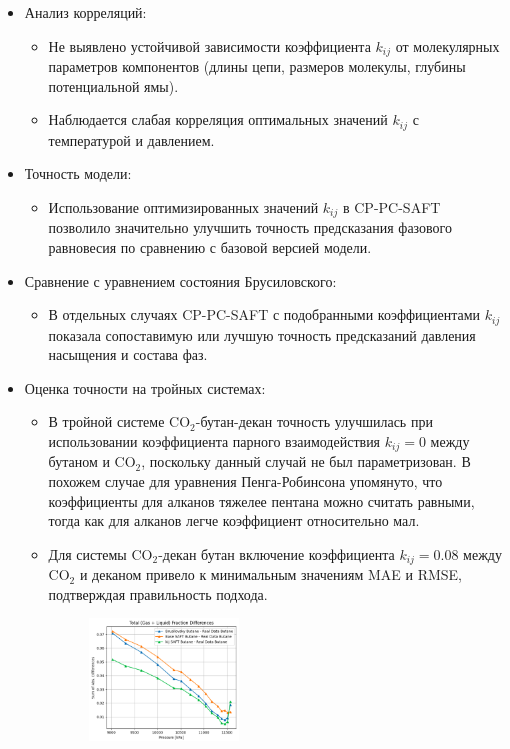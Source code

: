 \documentclass[a4paper,12pt]{article}
\begin{document}
\begin{itemize}
\begin{itemize}
    \end{itemize}
    \item Анализ корреляций:
    \begin{itemize}
        \item Не выявлено устойчивой зависимости коэффициента \( k_{ij} \) от молекулярных параметров компонентов (длины цепи, размеров молекулы, глубины потенциальной ямы).
        \item Наблюдается слабая корреляция оптимальных значений \( k_{ij} \) с температурой и давлением.
    \end{itemize}
    \item Точность модели:
    \begin{itemize}
        \item Использование оптимизированных значений \( k_{ij} \) в CP-PC-SAFT позволило значительно улучшить точность предсказания фазового равновесия по сравнению с базовой версией модели.
    \end{itemize}
    \item Сравнение с уравнением состояния Брусиловского:
    \begin{itemize}
        \item В отдельных случаях CP-PC-SAFT с подобранными коэффициентами \( k_{ij} \) показала сопоставимую или лучшую точность предсказаний давления насыщения и состава фаз.
    \end{itemize}
    \item Оценка точности на тройных системах:
	\begin{itemize}
		\item В тройной системе $\mathrm{CO}_{2}$-бутан-декан точность улучшилась при использовании коэффициента парного взаимодействия $k_{ij} = 0$ между бутаном и $\mathrm{CO}_{2}$, поскольку данный случай не был параметризован. В похожем случае для уравнения Пенга-Робинсона \cite{Brusilovskii2002} упомянуто, что коэффициенты для алканов тяжелее пентана можно считать равными, тогда как для алканов легче коэффициент относительно мал.
	    \item Для системы $\mathrm{CO}_{2}$-декан бутан включение коэффициента $k_{ij} = 0.08$ между $\mathrm{CO}_{2}$ и деканом привело к минимальным значениям MAE и RMSE, подтверждая правильность подхода.
\begin{figure}[ht]
    \centering
    \includegraphics[width=0.4\textwidth]{images/3_butane_molar_liquid.png} %

\end{figure}
\end{itemize}
\end{itemize}
\end{document}

